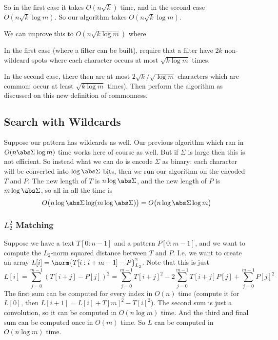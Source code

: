 So in the first case it takes $O(n\sqrt k)$ time, and in the second case $O(n\sqrt k\log m)$.
So our algorithm takes $O(n\sqrt k\log m)$.

We can improve this to $O(n\sqrt{k\log m})$ where
\benum
    \item In the first case (where a filter can be built), require that a filter have $2k$ non-wildcard spots where each character occurs at most $\sqrt{k\log m}$ times.
    \item In the second case, there then are at most $2\sqrt k/\sqrt{\log m}$ characters which are common: occur at least $\sqrt{k\log m}$ times).
        Then perform the algorithm as discussed on this new definition of commonness.
\eenum

\subsection{Search with Wildcards}

Suppose our pattern has wildcards as well.
Our previous algorithm which ran in $O(n\abs\Sigma\log m)$ time works here of course as well.
But if $\Sigma$ is large then this is not efficient.
So instead what we can do is encode $\Sigma$ as binary: each character will be converted into $\log\abs\Sigma$ bits, then we run our algorithm on the encoded $T$ and $P$.
The new length of $T$ is $n\log\abs\Sigma$, and the new length of $P$ is $m\log\abs\Sigma$, so all in all the time is
$$ O\bigl(n\log\abs\Sigma\log(m\log\abs\Sigma)\bigr) = O\bigl(n\log\abs\Sigma\log m\bigr) $$

\subsubsection{$L_2^2$ Matching}

Suppose we have a text $T[0:n-1]$ and a pattern $P[0:m-1]$, and we want to compute the $L_2$-norm squared distance between $T$ and $P$.
I.e. we want to create an array $L[i]=\norm{T[i:i+m-1]-P}_{L_2}^2$.
Note that this is just
$$ L[i] = \sum_{j=0}^{m-1}(T[i+j]-P[j])^2 = \sum_{j=0}^{m-1}T[i+j]^2 - 2\sum_{j=0}^{m-1}T[i+j]P[j] + \sum_{j=0}^{m-1}P[j]^2 $$
The first sum can be computed for every index in $O(n)$ time (compute it for $L[0]$, then $L[i+1]=L[i]+T[m]^2-T[i]^2$).
The second sum is just a convolution, so it can be computed in $O(n\log m)$ time.
And the third and final sum can be computed once in $O(m)$ time.
So $L$ can be computed in $O(n\log m)$ time.

